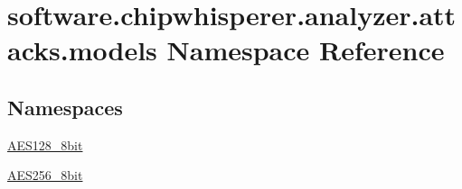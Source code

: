 \hypertarget{namespacesoftware_1_1chipwhisperer_1_1analyzer_1_1attacks_1_1models}{}\section{software.\+chipwhisperer.\+analyzer.\+attacks.\+models Namespace Reference}
\label{namespacesoftware_1_1chipwhisperer_1_1analyzer_1_1attacks_1_1models}
\subsection*{Namespaces}
\begin{DoxyCompactItemize}
\item 
 \hyperlink{namespacesoftware_1_1chipwhisperer_1_1analyzer_1_1attacks_1_1models_1_1AES128__8bit}{A\+E\+S128\+\_\+8bit}
\item 
 \hyperlink{namespacesoftware_1_1chipwhisperer_1_1analyzer_1_1attacks_1_1models_1_1AES256__8bit}{A\+E\+S256\+\_\+8bit}
\end{DoxyCompactItemize}

